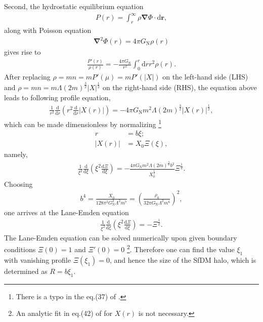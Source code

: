 \documentclass[aps,prd,twocolumn,10pt,groupedaddress]{revtex4-1}
\begin{document}
Second, the hydrostatic equilibrium equation
\begin{align}\label{eq:hydrostatic1}
P(r)=\int_r^\infty\rho\mathbf{\nabla}\Phi\cdot\mathrm{d}\mathbf{r},
\end{align}
along with Poisson equation
\begin{align}\label{eq:Poisson1}
\mathbf{\nabla}^2\Phi(r)=4\pi G_\mathrm{N}\rho(r)
\end{align}
gives rise to
\begin{align}\label{eq:hydroPoisson}
\frac{P'(r)}{\rho(r)}=-\frac{4\pi G_\mathrm{N}}{r^2}\int_0^r\mathrm{d}r r^2\rho(r).
\end{align}
After replacing $\rho=mn=mP'(\mu)=mP'(|X|)$ on the left-hand side (LHS) and $\rho=mn=m\Lambda(2m)^\frac32|X|^\frac12$ on the right-hand side (RHS), the equation above leads to following profile equation,
\begin{align}\label{eq:profile0}
\frac{1}{r^2}\frac{\mathrm{d}}{\mathrm{d}r}\left(r^2\frac{\mathrm{d}}{\mathrm{d}r}|X(r)|\right)=-4\pi G_\mathrm{N}m^2\Lambda(2m)^\frac32|X(r)|^\frac12,
\end{align}
which can be made dimensionless by normalizing \footnote{There is a typo in the eq.(37) of \cite{Berezhiani:2015bqa}.}
\begin{align}
r&=b\xi;\\
|X(r)|&=X_0\Xi(\xi),
\end{align}
namely,
\begin{align}
\frac{1}{\xi^2}\frac{\mathrm{d}}{\mathrm{d}\xi}\left(\xi^2\frac{\mathrm{d}\Xi}{\mathrm{d}\xi}\right)=-\frac{4\pi G_\mathrm{N}m^2\Lambda(2m)^\frac32b^2}{X_0^\frac12}\Xi^\frac12.
\end{align}
Choosing
\begin{align}
b^4=\frac{X_0}{128\pi^2G_\mathrm{N}^2\Lambda^2m^7}=\left(\frac{\rho_0}{32\pi G_\mathrm{N}\Lambda^2m^6}\right)^2,
\end{align}
one arrives at the Lane-Emden equation
\begin{align}\label{eq:profile1}
\frac{1}{\xi^2}\frac{\mathrm{d}}{\mathrm{d}\xi}\left(\xi^2\frac{\mathrm{d}\Xi}{\mathrm{d}\xi}\right)=-\Xi^\frac12.
\end{align}
The Lane-Emden equation can be solved numerically upon given boundary conditions $\Xi(0)=1$ and $\Xi'(0)=0$ \footnote{An analytic fit in eq.(42) of \cite{Berezhiani:2015bqa} for $X(r)$ is not necessary.}. Therefore one can find the value $\xi_1$ with vanishing profile $\Xi(\xi_1)=0$, and hence the size of the SfDM halo, which is determined as $R=b\xi_1$.
\end{document}
